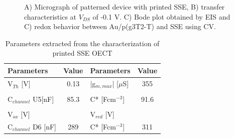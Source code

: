 \begin{figure}[ht]
    \centering
    \qquad
    \caption[Performance of solid-OECT with printed SSE]{A) Micrograph of patterned device with printed SSE, B) transfer characteristics at $V_{DS}$ of -0.1 V. C) Bode plot obtained by EIS and C) redox behavior between Au/p(g3T2-T) and SSE using CV.}
    \label{fig:printedSSE}
\end{figure}



\begin{table}[ht]
\centering
\caption{Parameters extracted from the characterization of printed SSE OECT}
\begin{tabular}{l|c||l|c}
Parameters & Value & Parameters & Value \\\hline \hline
V$_{Th}$ [V] &  0.13 & |g$_{m,max}$| [$\mu$S] & 355 \\
& & &\\[-1em]
C$_{channel}$ U5[nF] & 85.3 & C* [Fcm$^{-3}$] & 91.6 \\
& & &\\[-1em]
V$_{ox}$ [V] &  & V$_{red}$ [V] &  \\\hline
C$_{channel}$ D6 [nF] & 289 & C* [Fcm$^{-3}$] & 311 \\\hline
\end{tabular}
\label{tab:printedfom}
\end{table}


